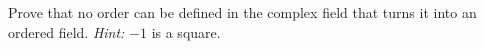 \begin{exercise}
	Prove that no order can be defined in the complex field that turns it into an ordered field. \textit{Hint:} $-1$ is a square.
\end{exercise}
